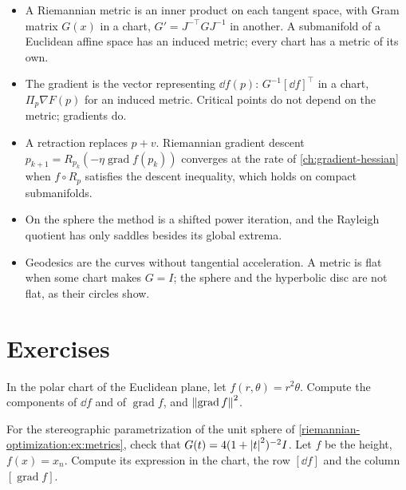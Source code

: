 \begin{notechapter}
\begin{chaptersummary}
\begin{itemize}[nosep]
  \item A Riemannian metric is an inner product on each tangent space,
        with Gram matrix $G(x)$ in a chart, $G' = J^{-\top}GJ^{-1}$ in
        another. A submanifold of a Euclidean affine space has an induced
        metric; every chart has a metric of its own.
  \item The gradient is the vector representing $\dd f(p)$:
        $G^{-1}[\dd f]^\top$ in a chart, $\Pi_p\nabla F(p)$ for an
        induced metric. Critical points do not depend on the metric;
        gradients do.
  \item A retraction replaces $p + v$. Riemannian gradient descent
        $p_{k+1} = R_{p_k}(-\eta\operatorname{grad}f(p_k))$ converges at
        the rate of \cref{ch:gradient-hessian} when $f\circ R_p$
        satisfies the descent inequality, which holds on compact
        submanifolds.
  \item On the sphere the method is a shifted power iteration, and the
        Rayleigh quotient has only saddles besides its global extrema.
  \item Geodesics are the curves without tangential acceleration. A
        metric is flat when some chart makes $G = I$; the sphere and the
        hyperbolic disc are not flat, as their circles show.
\end{itemize}
\end{chaptersummary}

\section*{Exercises}

\begin{exercise}\label{riemannian-optimization:exr:1}
In the polar chart of the Euclidean plane, let $f(r, \theta) = r^2\theta$.
Compute the components of $\dd f$ and of $\operatorname{grad}f$, and
$\left\|\operatorname{grad}f\right\|^2$.
\end{exercise}

\begin{exercise}\label{riemannian-optimization:exr:2}
For the stereographic parametrization of the unit sphere of
\cref{riemannian-optimization:ex:metrics}, check that
$G(t) = 4(1 + \left|t\right|^2)^{-2}I$. Let $f$ be the height, $f(x) = x_n$.
Compute its expression in the chart, the row $[\dd f]$ and the column
$[\operatorname{grad}f]$.
\end{exercise}


\end{notechapter}
